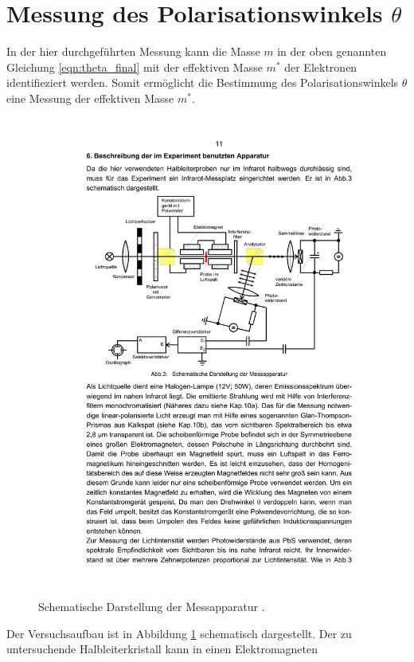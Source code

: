 \clearpage
\section{Messung des Polarisationswinkels $\theta$} %
\label{sec:messung}
In der hier durchgeführten Messung kann die Masse $m$ in der oben genannten
Gleichung \eqref{eqn:theta_final} mit der effektiven Masse $m^*$ der
Elektronen identifieziert werden.
Somit ermöglicht die Bestimmung des Polarisationswinkels $\theta$ eine Messung
der effektiven Masse $m^*$.

\begin{figure}[h]
    \centering
    \includegraphics[width=0.9\linewidth]{img/aufbau.pdf}
    \caption{
        Schematische Darstellung der Messapparatur \cite{V46}.
    }
    \label{fig:aufbau}
\end{figure}
Der Versuchsaufbau ist in Abbildung \ref{fig:aufbau} schematisch dargestellt.
Der zu untersuchende Halbleiterkristall kann in einen Elektromagneten
